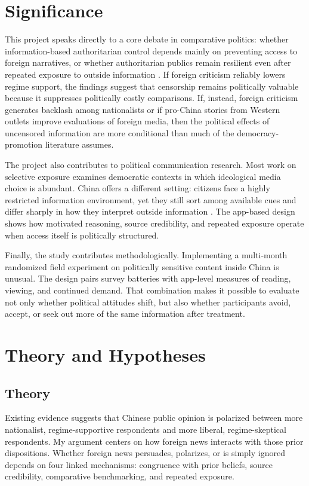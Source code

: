 \documentclass[12pt,american]{article}
\begin{document}
\section{Significance}

This project speaks directly to a core debate in comparative politics: whether information-based authoritarian control depends mainly on preventing access to foreign narratives, or whether authoritarian publics remain resilient even after repeated exposure to outside information \citep{gurievtreisman2019,stockmann2013,roberts2018}. If foreign criticism reliably lowers regime support, the findings suggest that censorship remains politically valuable because it suppresses politically costly comparisons. If, instead, foreign criticism generates backlash among nationalists or if pro-China stories from Western outlets improve evaluations of foreign media, then the political effects of uncensored information are more conditional than much of the democracy-promotion literature assumes.

The project also contributes to political communication research. Most work on selective exposure examines democratic contexts in which ideological media choice is abundant. China offers a different setting: citizens face a highly restricted information environment, yet they still sort among available cues and differ sharply in how they interpret outside information \citep{wangwestwood2024}. The app-based design shows how motivated reasoning, source credibility, and repeated exposure operate when access itself is politically structured.

Finally, the study contributes methodologically. Implementing a multi-month randomized field experiment on politically sensitive content inside China is unusual. The design pairs survey batteries with app-level measures of reading, viewing, and continued demand. That combination makes it possible to evaluate not only whether political attitudes shift, but also whether participants avoid, accept, or seek out more of the same information after treatment.

\section{Theory and Hypotheses}

\subsection{Theory}

Existing evidence suggests that Chinese public opinion is polarized between more nationalist, regime-supportive respondents and more liberal, regime-skeptical respondents. My argument centers on how foreign news interacts with those prior dispositions. Whether foreign news persuades, polarizes, or is simply ignored depends on four linked mechanisms: congruence with prior beliefs, source credibility, comparative benchmarking, and repeated exposure.
\end{document}
